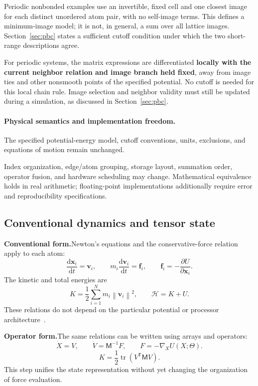 \documentclass[11pt,a4paper]{article}
\newcommand{\oldform}{\par\noindent\textbf{Conventional form.}\quad}
\newcommand{\newform}{\par\noindent\textbf{Operator form.}\quad}
\newcommand{\dd}{\mathrm d}
\newcommand{\tr}{\operatorname{tr}}
\newcommand{\norm}[1]{\left\lVert #1\right\rVert}
\newcommand{\vect}[1]{\bm{#1}}
\newcommand{\mass}{\mathsf M}
\theoremstyle{definition}
\begin{document}
Periodic nonbonded examples use an invertible, fixed cell and one closest image for each
distinct unordered atom pair, with no self-image terms. This defines a minimum-image model;
it is not, in general, a sum over all lattice images. Section~\ref{sec:pbc} states a sufficient
cutoff condition under which the two short-range descriptions agree.

For periodic systems, the matrix expressions are differentiated \textbf{locally with the current
neighbor relation and image branch held fixed}, away from image ties and other nonsmooth
points of the specified potential. No cutoff is needed for this local chain rule.
Image selection and neighbor validity must still be updated during a simulation, as discussed
in Section~\ref{sec:pbc}.


\paragraph{Physical semantics and implementation freedom.}
The specified potential-energy model, cutoff conventions, units, exclusions, and equations of
motion remain unchanged.

Index organization, edge/atom grouping, storage layout, summation order, operator fusion, and
hardware scheduling may change. Mathematical equivalence holds in real arithmetic;
floating-point implementations additionally require error and reproducibility specifications.



\subsection{Conventional dynamics and tensor state}
\label{sec:baseline}
\oldform Newton's equations and the conservative-force relation apply to each atom:
\begin{equation}
\frac{\dd\vect x_i}{\dd t}=\vect v_i,\qquad
m_i\frac{\dd\vect v_i}{\dd t}=\vect f_i,\qquad
\vect f_i=-\frac{\partial U}{\partial\vect x_i}.
\label{eq:newton-classic}
\end{equation}
The kinetic and total energies are
\begin{equation}
K=\frac12\sum_{i=1}^N m_i\norm{\vect v_i}^2,
\qquad \mathcal H=K+U.
\end{equation}
These relations do not depend on the particular potential or processor
architecture~\cite{gromacs-md}.

\newform The same relations can be written using arrays and operators:
\begin{equation}
\dot X=V,\qquad \dot V=\mass^{-1}F,\qquad F=-\nabla_XU(X;\Theta).
\label{eq:newton-tensor}
\end{equation}
\begin{equation}
K=\frac12\tr(V^{\mathsf T}\mass V).
\end{equation}
This step unifies the state representation without yet changing the organization of force
evaluation.
\end{document}
